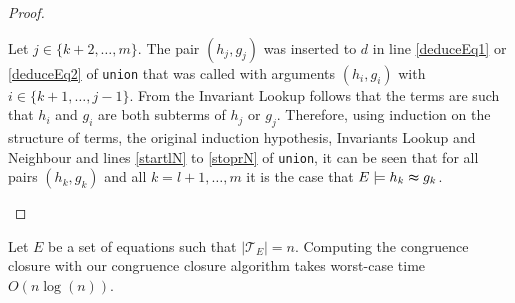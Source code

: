 \begin{proof}
\begin{itemize}
Let $j \in \{k+2,\ldots,m\}$.
The pair $(h_j,g_j)$ was inserted to $d$ in line \ref{deduceEq1} or \ref{deduceEq2} of \texttt{union} that was called with arguments $(h_i,g_i)$ with $i \in \{k+1,\ldots,j-1\}$.
From the Invariant Lookup follows that the terms are such that $h_i$ and $g_i$ are both subterms of $h_j$ or $g_j$.
Therefore, using induction on the structure of terms, the original induction hypothesis, Invariants Lookup and Neighbour and lines \ref{startlN} to \ref{stoprN} of \texttt{union}, it can be seen that for all pairs $(h_k,g_k)$ and all $k = l+1,\ldots,m$ it is the case that $E \models h_k \thickapprox g_k$.

%
%
%

\end{itemize}
\end{proof}

\begin{proposition}[Runtime]
\label{prop:runtime}
Let $E$ be a set of equations such that $|\mathcal{T}_E| = n$.
Computing the congruence closure with our congruence closure algorithm takes worst-case time $O(n \log(n))$.

\end{proposition}


